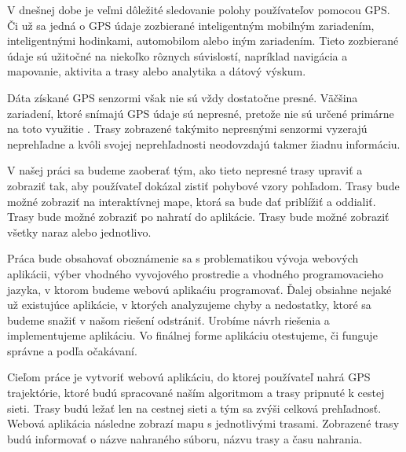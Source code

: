 \indent V dnešnej dobe je veľmi dôležité sledovanie polohy používateľov pomocou GPS. Či už sa jedná o GPS údaje zozbierané inteligentným mobilným zariadením, inteligentnými hodinkami, automobilom alebo iným zariadením. Tieto zozbierané údaje sú užitočné na niekoľko rôznych súvislostí, napríklad navigácia a mapovanie, aktivita a trasy alebo analytika a dátový výskum. 


Dáta získané GPS senzormi však nie sú vždy dostatočne presné. Väčšina zariadení, ktoré snímajú GPS údaje sú nepresné, pretože nie sú určené primárne na toto využitie \cite{993780}. Trasy zobrazené takýmito nepresnými senzormi vyzerajú neprehľadne a kvôli svojej neprehľadnosti neodovzdajú takmer žiadnu informáciu. 

V našej práci sa budeme zaoberať tým, ako tieto nepresné trasy upraviť a zobraziť tak, aby používateľ dokázal zistiť pohybové vzory pohľadom. Trasy bude možné zobraziť na interaktívnej mape, ktorá sa bude dať priblížiť a oddialiť. Trasy bude možné zobraziť po nahratí do aplikácie. Trasy bude možné zobraziť všetky naraz alebo jednotlivo.

Práca bude obsahovať oboznámenie sa s problematikou vývoja webových aplikácii, výber vhodného vyvojového prostredie a vhodného programovacieho jazyka, v ktorom budeme webovú aplikaćiu programovať. Ďalej obsiahne nejaké už existujúce aplikácie, v ktorých analyzujeme chyby a nedostatky, ktoré sa budeme snažiť v našom riešení odstrániť. Urobíme návrh riešenia a implementujeme aplikáciu. Vo finálnej forme aplikáciu otestujeme, či funguje správne a podľa očakávaní.

Cieľom práce je vytvoriť webovú aplikáciu, do ktorej používateľ nahrá GPS trajektórie, ktoré budú spracované naším algoritmom a trasy pripnuté k cestej sieti. Trasy budú ležať len na cestnej sieti a tým sa zvýši celková prehľadnosť. Webová aplikácia následne zobrazí mapu s jednotlivými trasami. Zobrazené trasy budú informovať o názve nahraného súboru, názvu trasy a času nahrania.
